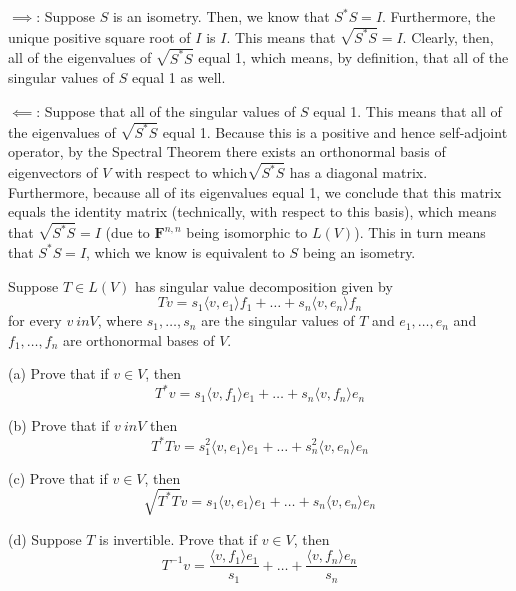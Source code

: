 \begin{solution}

    $\implies$: Suppose $S$ is an isometry. Then, we know that $S^*S = I$. Furthermore, the unique positive square root of $I$ is $I$. This means that $\sqrt{S^*S} = I$. Clearly, then, all of the eigenvalues of $\sqrt{S^*S}$ equal 1, which means, by definition, that all of the singular values of $S$ equal 1 as well.

    $\impliedby$: Suppose that all of the singular values of $S$ equal 1. This means that all of the eigenvalues of $\sqrt{S^*S}$ equal 1. Because this is a positive and hence self-adjoint operator, by the Spectral Theorem there exists an orthonormal basis of eigenvectors of $V$ with respect to which$\sqrt{S^*S}$ has a diagonal matrix. Furthermore, because all of its eigenvalues equal 1, we conclude that this matrix equals the identity matrix (technically, with respect to this basis), which means that $\sqrt{S^*S} = I$ (due to $\mathbf{F}^{n, n}$ being isomorphic to $L(V)$). This in turn means that $S^*S = I$, which we know is equivalent to $S$ being an isometry.
\end{solution}

\begin{exercise}{17}
    Suppose $T \in L(V)$ has singular value decomposition given by
    $$Tv = s_1 \langle v, e_1 \rangle f_1 + \ldots + s_n\langle v, e_n \rangle f_n$$
    for every $v \ in V$, where $s_1, \ldots, s_n$ are the singular values of $T$ and $e_1, \ldots, e_n$ and $f_1, \ldots, f_n$ are orthonormal bases of $V$.

    (a) Prove that if $v \in V$, then
    $$T^*v = s_1\langle v, f_1 \rangle e_1 + \ldots + s_n \langle v, f_n \rangle e_n$$

    (b) Prove that if $v \ in V$ then
    $$T^*Tv = s_1^2\langle v, e_1 \rangle e_1 + \ldots + s_n^2 \langle v, e_n \rangle e_n$$

    (c) Prove that if $v \in V$, then
    $$\sqrt{T^*T}v = s_1 \langle v, e_1 \rangle e_1 + \ldots + s_n \langle v, e_n \rangle e_n$$

    (d) Suppose $T$ is invertible. Prove that if $v \in V$, then
    $$T^{-1}v = \frac{\langle v, f_1 \rangle e_1}{s_1} + \ldots + \frac{\langle v, f_n \rangle e_n}{s_n}$$
\end{exercise}
 
